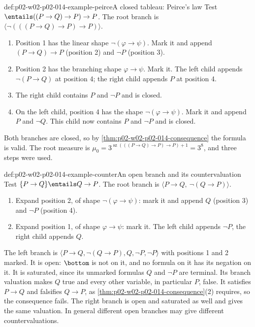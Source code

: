 \begin{hbexample}{def:p02-w02-p02-014-example-peirce}{A closed tableau: Peirce's law}
Test \(\entails((P\to Q)\to P)\to P\).  The root branch is
\(\langle\neg(((P\to Q)\to P)\to P)\rangle\).
\begin{enumerate}
  \item Position 1 has the linear shape \(\neg(\varphi\to\psi)\).  Mark it
        and append \((P\to Q)\to P\) (position 2) and \(\neg P\)
        (position 3).
  \item Position 2 has the branching shape \(\varphi\to\psi\).  Mark it.
        The left child appends \(\neg(P\to Q)\) at position 4; the right
        child appends \(P\) at position 4.
  \item The right child contains \(P\) and \(\neg P\) and is closed.
  \item On the left child, position 4 has the shape \(\neg(\varphi\to\psi)\).
        Mark it and append \(P\) and \(\neg Q\).  This child now contains
        \(P\) and \(\neg P\) and is closed.
\end{enumerate}
Both branches are closed, so by \cref{thm:p02-w02-p02-014-consequence} the
formula is valid.  The root measure is
\(\mu_0=3^{\operatorname{sz}(((P\to Q)\to P)\to P)+1}=3^{8}\), and three
steps were used.
\end{hbexample}

\begin{hbexample}{def:p02-w02-p02-014-example-counter}{An open branch and its countervaluation}
Test \(\{P\to Q\}\entails Q\to P\).  The root branch is
\(\langle P\to Q,\ \neg(Q\to P)\rangle\).
\begin{enumerate}
  \item Expand position 2, of shape \(\neg(\varphi\to\psi)\): mark it and
        append \(Q\) (position 3) and \(\neg P\) (position 4).
  \item Expand position 1, of shape \(\varphi\to\psi\): mark it.  The left
        child appends \(\neg P\), the right child appends \(Q\).
\end{enumerate}
The left branch is
\(\langle P\to Q,\neg(Q\to P),Q,\neg P,\neg P\rangle\) with positions 1 and
2 marked.  It is open: \(\bottom\) is not on it, and no formula on it has
its negation on it.  It is saturated, since its unmarked formulas \(Q\) and
\(\neg P\) are terminal.  Its branch valuation makes \(Q\) true and every other variable,
in particular \(P\), false.  It satisfies \(P\to Q\) and falsifies
\(Q\to P\), as \cref{thm:p02-w02-p02-014-consequence}(2) requires, so the
consequence fails.  The right branch is open and saturated as well and gives
the same valuation.  In general different open branches may give different
countervaluations.
\end{hbexample}

